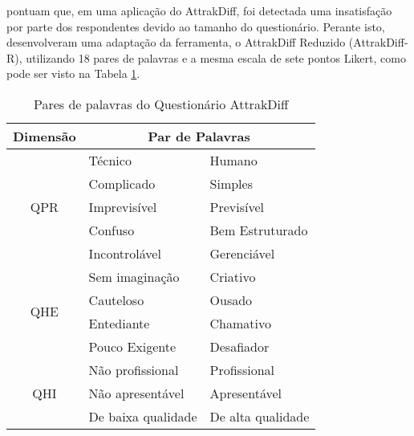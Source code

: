  pontuam que, em uma aplicação do AttrakDiff, foi detectada uma insatisfação por parte dos respondentes devido ao tamanho 
do questionário. Perante isto, desenvolveram uma adaptação da ferramenta, o AttrakDiff Reduzido (AttrakDiff-R), utilizando 18 pares de palavras e a mesma 
escala de sete pontos Likert, como pode ser visto na Tabela \ref{tab02}.

\begin{table}[h]
    \centering
    \caption{Pares de palavras do Questionário AttrakDiff}
    \begin{adjustbox}{center}
    \label{tab02}
    \begin{tabular}{c|ll}
    \hline
    \textbf{Dimensão}             & \multicolumn{2}{c}{\textbf{Par de Palavras}}                                 \\ \hline
    \multirow{5}{*}{QPR} & \multicolumn{1}{l|}{Técnico}                 & Humano                \\ \cline{2-3} 
                         & \multicolumn{1}{l|}{Complicado}              & Simples               \\ \cline{2-3} 
                         & \multicolumn{1}{l|}{Imprevisível}            & Previsível            \\ \cline{2-3} 
                         & \multicolumn{1}{l|}{Confuso}                 & Bem Estruturado       \\ \cline{2-3} 
                         & \multicolumn{1}{l|}{Incontrolável}           & Gerenciável           \\ \hline
    \multirow{4}{*}{QHE} & \multicolumn{1}{l|}{Sem imaginação}          & Criativo              \\ \cline{2-3} 
                         & \multicolumn{1}{l|}{Cauteloso}               & Ousado                \\ \cline{2-3} 
                         & \multicolumn{1}{l|}{Entediante}              & Chamativo             \\ \cline{2-3} 
                         & \multicolumn{1}{l|}{Pouco Exigente}          & Desafiador            \\ \hline
    \multirow{5}{*}{QHI} & \multicolumn{1}{l|}{Não profissional}        & Profissional          \\ \cline{2-3} 
                         & \multicolumn{1}{l|}{Não apresentável}        & Apresentável          \\ \cline{2-3} 
                         & \multicolumn{1}{l|}{De baixa qualidade}      & De alta qualidade     \\ \cline{2-3} 

\end{tabular}
\end{adjustbox}
\end{table}
